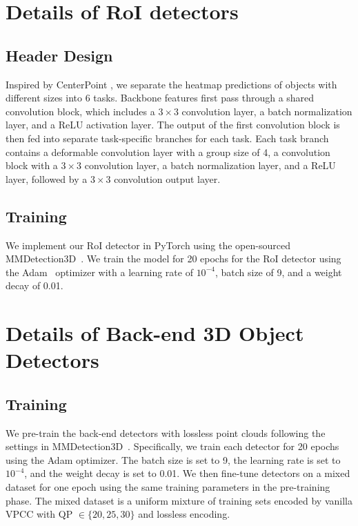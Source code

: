 \clearpage
\setcounter{page}{1}
\maketitlesupplementary


\section{Details of RoI detectors}
\label{sup-roi-detector}
\subsection{Header Design}
Inspired by CenterPoint \cite{yin2021center}, we separate the heatmap predictions of objects with different sizes into 6 tasks. Backbone features first pass through a shared convolution block, which includes a $3 \times 3$ convolution layer, a batch normalization layer, and a ReLU activation layer. The output of the first convolution block is then fed into separate task-specific branches for each task. Each task branch contains a deformable convolution layer with a group size of 4, a convolution block with a $3 \times 3$ convolution layer, a batch normalization layer, and a ReLU layer, followed by a $3 \times 3$ convolution output layer.

\subsection{Training}
We implement our RoI detector in PyTorch using the open-sourced MMDetection3D~\cite{mmdet3d2020}. We train the model for 20 epochs for the RoI detector using the Adam~\cite{kingma2014adam} optimizer with a learning rate of $10^{-4}$, batch size of 9, and a weight decay of 0.01.

\section{Details of Back-end 3D Object Detectors}
\label{sup-backend-detector}
\subsection{Training}
We pre-train the back-end detectors with lossless point clouds following the settings in MMDetection3D~\cite{mmdet3d2020}. Specifically, we train each detector for 20 epochs using the Adam optimizer. The batch size is set to 9, the learning rate is set to $10^{-4}$, and the weight decay is set to 0.01. We then fine-tune detectors on a mixed dataset for one epoch using the same training parameters in the pre-training phase. The mixed dataset is a uniform mixture of training sets encoded by vanilla VPCC with QP $\in \{20, 25, 30\}$ and lossless encoding.
